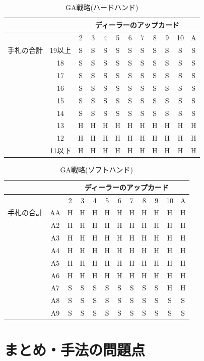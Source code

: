   \begin{table}[htbp]
    \centering
    \caption{GA戦略(ハードハンド)\label{gastrategyhard}}
    \begin{tabular}{|c|c|c|c|c|c|c|c|c|c|c|c|}
      \hline
      \multicolumn{2}{|c|}{} & \multicolumn{10}{|c|}{ディーラーのアップカード} \\ \hline
      \multicolumn{2}{|c|}{} & 2 & 3 & 4 & 5 & 6 & 7 & 8 & 9 & 10 & A \\ \hline
      手札の合計 & 19以上 & S & S & S & S & S & S & S & S & S & S \\ \cline{3-12}
                & 18 & S & S & S & S & S & S & S & S & S & S \\ \cline{3-12}
                & 17 & S & S & S & S & S & S & S & S & S & S \\ \cline{3-12}
                & 16 & S & S & S & S & S & S & S & S & S & S \\ \cline{3-12}
                & 15 & S & S & S & S & S & S & S & S & S & S \\ \cline{3-12}
                & 14 & S & S & S & S & S & S & S & S & S & S \\ \cline{3-12}
                & 13 & H & H & H & H & H & H & H & H & H & H \\ \cline{3-12}
                & 12 & H & H & H & H & H & H & H & H & H & H \\ \cline{3-12}
                & 11以下 & H & H & H & H & H & H & H & H & H & H \\ \hline
    \end{tabular}
  \end{table}

  \begin{table}[htbp]
    \centering
    \caption{GA戦略(ソフトハンド)\label{gastrategysoft}}
    \begin{tabular}{|c|c|c|c|c|c|c|c|c|c|c|c|}
      \hline
      \multicolumn{2}{|c|}{} & \multicolumn{10}{|c|}{ディーラーのアップカード} \\ \hline
      \multicolumn{2}{|c|}{} & 2 & 3 & 4 & 5 & 6 & 7 & 8 & 9 & 10 & A \\ \hline
      手札の合計 & AA & H & H & H & H & H & H & H & H & H & H \\ \cline{3-12}
                & A2 & H & H & H & H & H & H & H & H & H & H \\ \cline{3-12}
                & A3 & H & H & H & H & H & H & H & H & H & H \\ \cline{3-12}
                & A4 & H & H & H & H & H & H & H & H & H & H \\ \cline{3-12}
                & A5 & H & H & H & H & H & H & H & H & H & H \\ \cline{3-12}
                & A6 & H & H & H & H & H & H & H & H & H & H \\ \cline{3-12}
                & A7 & S & S & S & S & S & S & S & S & H & H \\ \cline{3-12}
                & A8 & S & S & S & S & S & S & S & S & S & S \\ \cline{3-12}
                & A9 & S & S & S & S & S & S & S & S & S & S \\ \hline
    \end{tabular}
  \end{table}


\section{まとめ・手法の問題点}